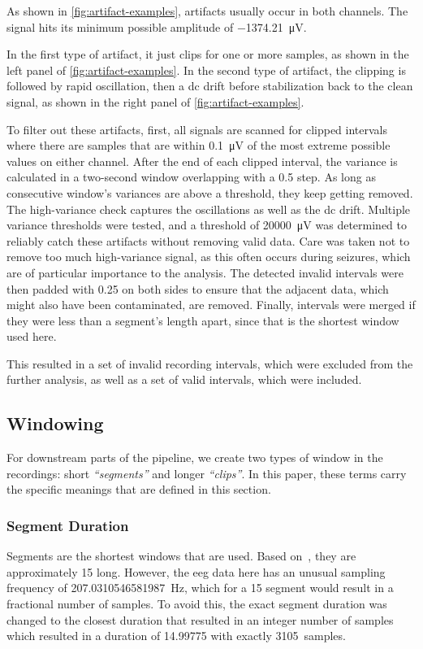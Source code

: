 As shown in \cref{fig:artifact-examples}, artifacts usually occur in both channels.
The signal hits its minimum possible amplitude of \SI{-1374.21}{\micro\volt}.

In the first type of artifact, it just clips for one or more samples, as shown in the left panel of \cref{fig:artifact-examples}.
In the second type of artifact, the clipping is followed by rapid oscillation, then a \gls{dc} drift before stabilization back to the clean signal, as shown in the right panel of \cref{fig:artifact-examples}.

To filter out these artifacts, first, all signals are scanned for clipped intervals where there are samples that are within \SI{0.1}{\micro\volt} of the most extreme possible values on either channel.
After the end of each clipped interval, the variance is calculated in a two-second window overlapping with a \SI{0.5}{\sec} step.
As long as consecutive window's variances are above a threshold, they keep getting removed.
The high-variance check captures the oscillations as well as the \gls{dc} drift.
Multiple variance thresholds were tested, and a threshold of \SI{20000}{\micro\volt} was determined to reliably catch these artifacts without removing valid data.
Care was taken not to remove too much high-variance signal, as this often occurs during seizures, which are of particular importance to the analysis.
The detected invalid intervals were then padded with \SI{0.25}{\sec} on both sides to ensure that the adjacent data, which might also have been contaminated, are removed.
Finally, intervals were merged if they were less than a segment's length apart, since that is the shortest window used here.

This resulted in a set of invalid recording intervals, which were excluded from the further analysis, as well as a set of valid intervals, which were included.

\subsection{Windowing} \label{subsec:windowing}
For downstream parts of the pipeline, we create two types of window in the recordings: short \textit{``segments''} and longer \textit{``clips''}.
In this paper, these terms carry the specific meanings that are defined in this section.

\subsubsection{Segment Duration}
Segments are the shortest windows that are used.
Based on~\textcite{yang_seizure_2024}, they are approximately \SI{15}{\sec} long.
However, the \gls{eeg} data here has an unusual sampling frequency of \SI{207.0310546581987}{\hertz}, which for a \SI{15}{\sec} segment would result in a fractional number of samples.
To avoid this, the exact segment duration was changed to the closest duration that resulted in an integer number of samples which resulted in a duration of \SI{14.99775}{\sec} with exactly \SI{3105}{samples}.

